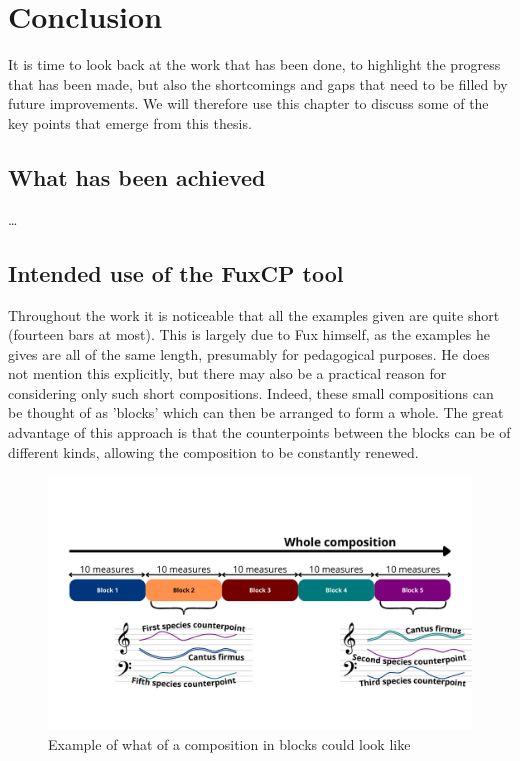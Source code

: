 \chapter{Conclusion}
It is time to look back at the work that has been done, to highlight the progress that has been made, but also the shortcomings and gaps that need to be filled by future improvements. We will therefore use this chapter to discuss some of the key points that emerge from this thesis.

\section{What has been achieved}
\dots
 
\section{Intended use of the FuxCP tool}
Throughout the work it is noticeable that all the examples given are quite short (fourteen bars at most). This is largely due to Fux himself, as the examples he gives are all of the same length, presumably for pedagogical purposes. He does not mention this explicitly, but there may also be a practical reason for considering only such short compositions. Indeed, these small compositions can be thought of as 'blocks' which can then be arranged to form a whole. The great advantage of this approach is that the counterpoints between the blocks can be of different kinds, allowing the composition to be constantly renewed.

\begin{figure}[h]
  \centering
  \includegraphics[width=5.2in]{Images/composition-in-blocks.png}
  \caption{Example of what of a composition in blocks could look like}
  \label{fig:composition-in-blocks}
\end{figure}

